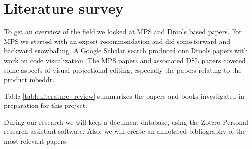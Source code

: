 \section{Literature survey}

To get an overview of the field we looked at MPS and Drools based papers.  
For MPS we started with an expert recommendation and did some forward and backward snowballing.
A Google Scholar search produced one Drools papers with work on code visualization. 
The MPS papers and associated DSL papers covered some aspects of visual projectional editing, especially the papers relating to the product mbeddr.

Table \ref{table:literature_review} summarizes the papers and books investigated in preparation for this project.

During our research we will keep a document database, using the Zotero Personal research assistant software\cite{Zotero_product_page}.
Also, we will create an annotated bibliography of the most relevant papers.


